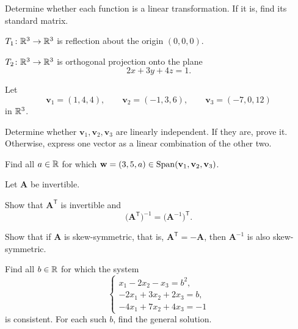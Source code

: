 \documentclass[11pt,oneside]{article}
\begin{document}
\begin{problem}
Determine whether each function is a linear transformation. If it is, find its standard matrix.
\begin{problemsubparts}
\item $T_1\colon\mathbb{R}^3\to\mathbb{R}^3$ is reflection about the origin $(0,0,0)$.
\item $T_2\colon\mathbb{R}^3\to\mathbb{R}^3$ is orthogonal projection onto the plane
\[
2x+3y+4z=1.
\]
\end{problemsubparts}
\end{problem}

\begin{problem}
Let
\[
\mathbf v_1=(1,4,4),\qquad
\mathbf v_2=(-1,3,6),\qquad
\mathbf v_3=(-7,0,12)
\]
in $\mathbb{R}^3$.
\begin{problemsubparts}
\item Determine whether $\mathbf v_1,\mathbf v_2,\mathbf v_3$ are linearly independent. If they are, prove it. Otherwise, express one vector as a linear combination of the other two.
\item Find all $a\in\mathbb{R}$ for which $\mathbf w=(3,5,a)\in\operatorname{Span}(\mathbf v_1,\mathbf v_2,\mathbf v_3)$.
\end{problemsubparts}
\end{problem}

\begin{problem}
Let $\mathbf A$ be invertible.
\begin{problemsubparts}
\item Show that $\mathbf A^{\mathsf T}$ is invertible and
\[
\bigl(\mathbf A^{\mathsf T}\bigr)^{-1}=\bigl(\mathbf A^{-1}\bigr)^{\mathsf T}.
\]
\item Show that if $\mathbf A$ is skew-symmetric, that is, $\mathbf A^{\mathsf T}=-\mathbf A$, then $\mathbf A^{-1}$ is also skew-symmetric.
\end{problemsubparts}
\end{problem}

\begin{problem}
Find all $b\in\mathbb{R}$ for which the system
\[
\begin{cases}
x_1-2x_2-x_3=b^2,\\
-2x_1+3x_2+2x_3=b,\\
-4x_1+7x_2+4x_3=-1
\end{cases}
\]
is consistent. For each such $b$, find the general solution.
\end{problem}
\end{document}
